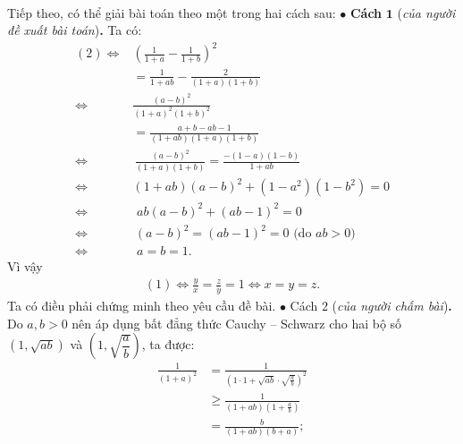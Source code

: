 \begin{multicols}{2}
\begin{align*}
	\end{align*}
	Tiếp theo, có thể giải bài toán theo một trong hai cách sau:
	\vskip 0.05cm
	$\bullet$ \textbf{\color{thachthuctoanhoc}Cách} $\pmb{1}$ (\textit{của người đề xuất bài toán})\textbf{\color{thachthuctoanhoc}.}
	\vskip 0.05cm
	Ta có:
	\begin{align*}
		(2)\Leftrightarrow &{\left( {\frac{1}{{1 + a}} - \frac{1}{{1 + b}}} \right)^2} \\
		&= \frac{1}{{1 + ab}} - \frac{2}{{\left( {1 + a} \right)\left( {1 + b} \right)}}\\
		\Leftrightarrow &\frac{{{{\left( {a - b} \right)}^2}}}{{{{\left( {1 + a} \right)}^2}{{\left( {1 + b} \right)}^2}}} \\
		&= \frac{{a + b - ab - 1}}{{\left( {1 + ab} \right)\left( {1 + a} \right)\left( {1 + b} \right)}}\\
		\Leftrightarrow&\, \frac{{{{\left( {a - b} \right)}^2}}}{{\left( {1 + a} \right)\left( {1 + b} \right)}}= \frac{{ - \left( {1 - a} \right)\left( {1 - b} \right)}}{{1 + ab}}\\
		\Leftrightarrow &\left( {1 \!+\! ab} \right)\!{\left( {a \!-\! b} \right)^2} \!+\! \left(\!\! {1 \!-\! {a^2}} \right)\!\!\left(\!\! {1 \!-\! {b^2}} \right) \!=\! 0\\
		\Leftrightarrow &\,\,ab{\left( {a - b} \right)^2} + {\left( {ab - 1} \right)^2} = 0\\
		\Leftrightarrow &\,{\left( {a - b} \right)^2} = {\left( {ab - 1} \right)^2} = 0 \text{ (do $ab>0$)}\\
		\Leftrightarrow &\,\,a = b = 1.
	\end{align*} 
	Vì vậy
	\begin{align*}
		(1) \Leftrightarrow \frac{y}{x} = \frac{z}{y} = 1 \Leftrightarrow x = y =z.
	\end{align*}
	Ta có điều phải chứng minh theo yêu cầu đề bài.
	\vskip 0.05cm
	$\bullet$ Cách $2$ (\textit{của người chấm bài})\textbf{\color{thachthuctoanhoc}.}
	\vskip 0.05cm
	Do $a, b > 0$ nên áp dụng bất đẳng thức Cauchy -- Schwarz cho hai bộ số  $(1,\sqrt{ab})$ và  $\left(1, \sqrt{\dfrac{a}{b}}\right)$, ta được:
	\columnbreak
	\begin{align*}
		\frac{1}{{{{\left( {1 + a} \right)}^2}}} &= \frac{1}{{{{\left( {1 \cdot 1 + \sqrt {ab}  \cdot \sqrt {\frac{a}{b}} } \right)}^2}}} \\
		&\ge \frac{1}{{\left( {1 + ab} \right)\left( {1 + \frac{a}{b}} \right)}} \\
		&= \frac{b}{{\left( {1 + ab} \right)\left( {b + a} \right)}};

\end{align*}
\end{multicols}
